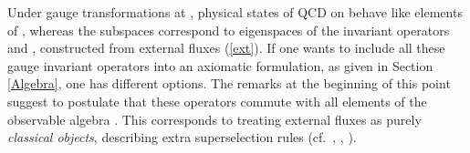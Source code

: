 \documentclass[a4paper,12pt]{article}
\begin{document}
\begin{enumerate}
Under gauge transformations at \coordHE{}, physical
states of QCD on \myHighlight{$\Lambda$}\coordHE{} behave like elements of \coordHE{}, whereas the subspaces \coordHE{} correspond to eigenspaces of the invariant
operators \coordHE{} and \coordHE{}, constructed from
external fluxes (\ref{ext}). If one wants to include all these
gauge invariant operators into an axiomatic formulation, as given
in Section \ref{Algebra}, one has different options. The remarks
at the beginning of this point suggest to postulate that these
operators commute with all elements of the observable algebra
\coordHE{}. This corresponds to treating external fluxes
as purely {\em classical objects}, describing extra superselection
rules (cf.~\cite{Bu}, \cite{SW1}, \cite{S}).


\end{enumerate}
\end{document}
